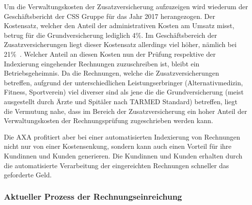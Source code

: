Um die Verwaltungskosten der Zusatzversicherung aufzuzeigen wird wiederum der Ge\-schäfts\-be\-richt der CSS Gruppe für das Jahr 2017 herangezogen. Der Kostensatz, welcher den Anteil der administrativen Kosten am Umsatz misst, betrug für die Grundversicherung lediglich 4\%. Im Geschäftsbereich der Zusatzversicherungen liegt dieser Kostensatz allerdings viel höher, nämlich bei 21\%~\autocite{CSSGruppe2018}. Welcher Anteil an diesen Kosten nun der Prüfung respektive der Indexierung eingehender Rechnungen zuzuschreiben ist, bleibt ein Betriebsgeheimnis. Da die Rechnungen, welche die Zusatzversicherungen betreffen, aufgrund der unterschiedlichen Leistungserbringer (Alternativmedizin, Fitness, Sportverein) viel diverser sind als jene die die Grundversicherung (meist ausgestellt durch Ärzte und Spitäler nach TARMED Standard) betreffen, liegt die Vermutung nahe, dass im Bereich der Zusatzversicherung ein hoher Anteil der Verwaltungskosten der Rechnungsprüfung zugeschrieben werden kann.

Die AXA profitiert aber bei einer automatisierten Indexierung von Rechnungen nicht nur von einer Kostensenkung, sondern kann auch einen Vorteil für ihre Kundinnen und Kunden generieren. Die Kundinnen und Kunden erhalten durch die automatisierte Verarbeitung der eingereichten Rechnungen schneller das geforderte Geld.




\subsubsection{Aktueller Prozess der Rechnungseinreichung}

